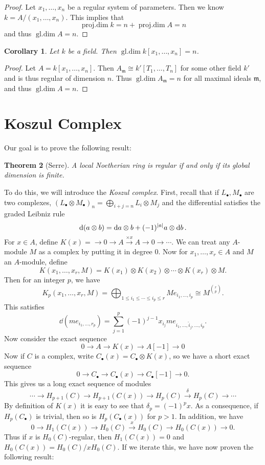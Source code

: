 \documentclass[leqno, openany]{memoir}
\newtheorem{thm}{Theorem}[section]
\newtheorem{cor}[thm]{Corollary}
\theoremstyle{definition}
\theoremstyle{remark}
\theoremstyle{plain}
\theoremstyle{definition}
\theoremstyle{remark}
\newcommand{\mf}[1]{\mathfrak{#1}}
\newcommand{\wh}[1]{\widehat{#1}}
\DeclareMathOperator{\pdim}{proj.dim}
\DeclareMathOperator{\gdim}{gl.dim}
\begin{document}
\begin{proof} Let $x_1, \ldots, x_n$ be a regular system of parameters. Then we
    know $k = A/(x_1, \ldots, x_n)$. This implies that \[ \pdim k = n + \pdim A
    = n \] and thus $\gdim A = n$.  \end{proof}

\begin{cor} Let $k$ be a field. Then $\gdim k[x_1, \ldots, x_n] = n$.
\end{cor}

\begin{proof} Let $A = k[x_1, \ldots, x_n]$. Then $A_{\mf{m}} \cong k'[T_1,
    \ldots, T_n]$ for some other field $k'$ and is thus regular of dimension
    $n$. Thus $\gdim A_{\mf{m}} = n$ for all maximal ideals $\mf{m}$, and thus
    $\gdim A = n$.  \end{proof}

\section{Koszul Complex}%

Our goal is to prove the following result: \begin{thm}[Serre] \label{thm:rlrgd}
A local Noetherian ring is regular if and only if its global dimension is
finite.  \end{thm}

To do this, we will introduce the \textit{Koszul complex}. First, recall that
if $L_{\bullet}, M_{\bullet}$ are two complexes, $(L_{\bullet} \otimes
M_{\bullet})_n = \bigoplus_{i+j = n} L_i \otimes M_j$ and the differential
satisfies the graded Leibniz rule \[ \dd(a \otimes b) = \dd{a} \otimes b +
(-1)^{\abs{a}} a \otimes \dd{b}. \] For $x \in A$, define $K(x) = \to 0 \to A
\xrightarrow{\times x} A \to 0 \to  \cdots$. We can treat any $A$-module $M$ as
a complex by putting it in degree $0$. Now for $x_1, \ldots, x_r \in A$ and $M$
an $A$-module, define \[ K(x_1, \ldots, x_r, M) = K(x_1) \otimes K(x_2) \otimes
    \cdots \otimes K(x_r) \otimes M. \] Then for an integer $p$, we have \[
K_p(x_1, \ldots, x_r, M) = \bigoplus_{1 \leq i_1 \leq \cdots \leq i_p \leq r} M
e_{i_1, \dots, i_p} \cong M^{\binom{r}{p}}. \] This satisfies \[ \dd{(m e_{i_1,
\ldots, r_p})} = \sum_{j=1}^p (-1)^{j-1} x_{i_j} m e_{i_1, \ldots, \wh{i}_j,
\ldots, i_p}. \] Now consider the exact sequence \[ 0 \to A \to K(x) \to A[-1]
\to 0 \] Now if $C$ is a complex, write $C_{\bullet}(x) = C_{\bullet} \otimes
K(x)$, so we have a short exact sequence \[ 0 \to C_{\bullet} \to
    C_{\bullet}(x) \to C_{\bullet}[-1] \to 0. \] This gives us a long exact
    sequence of modules \[ \cdots \to H_{p+1}(C) \to H_{p+1}(C(x)) \to H_p(C)
    \xrightarrow{\delta} H_p(C) \to \cdots \] By definition of $K(x)$ it is
    easy to see that $\delta_p = (-1)^p x$. As a consequence, if
    $H_p(C_{\bullet})$ is trivial, then so is $H_p(C_{\bullet}(x))$ for $p >
    1$. In addition, we have \[ 0 \to H_1(C(x)) \to H_0(C) \xrightarrow{x}
    H_0(C) \to H_0(C(x)) \to 0. \] Thus if $x$ is $H_0(C)$-regular, then
    $H_1(C(x)) = 0$ and $H_0(C(x)) = H_0(C) / x H_0(C)$. If we iterate this, we
    have now proven the following result:
\end{document}
